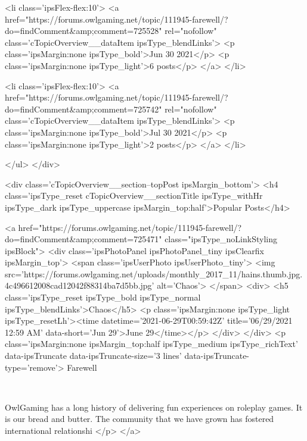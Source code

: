 						<li class='ipsFlex-flex:10'>
							<a href="https://forums.owlgaming.net/topic/111945-farewell/?do=findComment&amp;comment=725528" rel="nofollow" class='cTopicOverview__dataItem ipsType_blendLinks'>
								<p class='ipsMargin:none ipsType_bold'>Jun 30 2021</p>
								<p class='ipsMargin:none ipsType_light'>6 posts</p>
							</a>
						</li>
					
						<li class='ipsFlex-flex:10'>
							<a href="https://forums.owlgaming.net/topic/111945-farewell/?do=findComment&amp;comment=725742" rel="nofollow" class='cTopicOverview__dataItem ipsType_blendLinks'>
								<p class='ipsMargin:none ipsType_bold'>Jul 30 2021</p>
								<p class='ipsMargin:none ipsType_light'>2 posts</p>
							</a>
						</li>
					
				</ul>
			</div>
		
		
			<div class='cTopicOverview__section--topPost ipsMargin_bottom'>
				<h4 class='ipsType_reset cTopicOverview__sectionTitle ipsType_withHr ipsType_dark ipsType_uppercase ipsMargin_top:half'>Popular Posts</h4>
				
					<a href="https://forums.owlgaming.net/topic/111945-farewell/?do=findComment&amp;comment=725471" class="ipsType_noLinkStyling ipsBlock">
						<div class='ipsPhotoPanel ipsPhotoPanel_tiny ipsClearfix ipsMargin_top'>
							<span class='ipsUserPhoto ipsUserPhoto_tiny'>
								<img src='https://forums.owlgaming.net/uploads/monthly_2017_11/hains.thumb.jpg.4c496612008cad12042f88314ba7d5bb.jpg' alt='Chaos'>
							</span>
							<div>
								<h5 class='ipsType_reset ipsType_bold ipsType_normal ipsType_blendLinks'>Chaos</h5>
								<p class='ipsMargin:none ipsType_light ipsType_resetLh'><time datetime='2021-06-29T00:59:42Z' title='06/29/2021 12:59  AM' data-short='Jun 29'>June 29</time></p>
							</div>
						</div>
						<p class='ipsMargin:none ipsMargin_top:half ipsType_medium ipsType_richText' data-ipsTruncate data-ipsTruncate-size='3 lines' data-ipsTruncate-type='remove'>
							Farewell
	 



	 
 


	OwlGaming has a long history of delivering fun experiences on roleplay games. It is our bread and butter. The community that we have grown has fostered international relationshi
						</p>
					</a>
				

